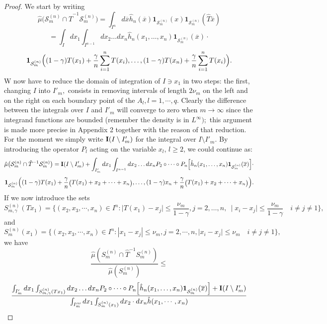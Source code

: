 \documentclass[12pt,reqno,a4paper]{amsart}
\begin{document}
\begin{proof}
We start  by writing
  $$\hat{\mu}\big(\mathcal{S}^{(n)}_{m}\cap\hat{T}^{-1}\mathcal{S}^{(n)}_{m}\big)= \int_{I^n} d\overline{x} \hat{h}_n(\overline{x}) \textbf{1}_{\mathcal{S}^{(n)}_{m}}(x)\textbf{1}_{\mathcal{S}^{(n)}_{m}}(\hat{T}\overline{x})$$
  $$ =\int_I dx_{1}\int_{I^{n-1}} dx_{2}\dots dx_{n} \hat{h}_n(x_1,\dots,x_n){\textbf{1}}_{\mathcal{S}^{(n)}_{m}}(\overline{x})\cdot $$$${\textbf{1}}_{\mathcal{S}^{(n)}_{m}}\Big({\tiny(1-\gamma)T(x_1)+ \frac{\gamma}{n}\sum_{i=1}^{n}T(x_{i}),\dots, (1-\gamma)T(x_n) +\frac{\gamma}{n}\sum_{i=1}^{n}T(x_{i})}\Big).$$
  W now have  to reduce the domain of integration of $I\ni x_1$ in two steps: the first, changing $I$ into $I'_m,$ consists in removing intervals of length $2\nu_m$ on the left and on the right on each boundary point of the $A_l, l=1,\cdots, q.$ Clearly the difference between the integrals over $I$ and $I'_m$ will converge to zero when $m\rightarrow \infty$ since the integrand functions are bounded (remember the density is in $L^{\infty});$  this argument is  made more precise in Appendix 2 together with the reason of that reduction. For the moment we simply write ${\bf I}(I \setminus I'_m)$ for the integral over $I\setminus I'_m.$
	 	By introducing the operator $P_l$ acting on the variable $x_l$, $l\ge 2$, we could continue  as:	 	$$\hat{\mu}\big(\mathcal{S}^{(n)}_{m}\cap\hat{T}^{-1}\mathcal{S}^{(n)}_{m}\big)= {\bf I}(I\setminus I'_m)+ \int_{I'_m} dx_{1}\int_{I^{n-1}} dx_{2}\dots dx_{n} P_{2}\circ\dots\circ P_{n} \Big[\hat{h}_n(x_1,\dots,x_n){\textbf{1}}_{\mathcal{S}^{(n)}_{m}}(\overline{x})\Big]\cdot	
	 	 $$
	 	$$ {\textbf{1}}_{\mathcal{S}^{(n)}_{m}}\Big({\tiny(1-\gamma)T(x_1) +\frac{\gamma}{n}\big(T(x_{1})+x_{2}+\dots+x_{n}\big),\dots, (1-\gamma)x_n +\frac{\gamma}{n}\big(T(x_{1})+x_{2}+\dots+x_{n}\big)}\Big).$$
If we now introduce the sets
$$
S^{(n)}_{m,\gamma}(Tx_1)=\{(x_2,x_3,\cdots,x_n)\in I^n: \mid T(x_1)-x_{j}\mid  \leq  \frac{\nu_{m}}{1-\gamma}, j= 2,\dots,n,\
	 	    \mid x_{i}-x_{j}\mid  \leq  \frac{\nu_{m}}{1-\gamma}\quad i\not=j\not=1\} ,
$$
and
$$
S^{(n)}_{m}(x_1)=\{(x_2,x_3,\cdots,x_n)\in I^n: |x_1-x_j|\le \nu_m, j=2,\cdots,n, \mid x_{i}-x_{j}\mid  \leq  \nu_{m}\quad i\not=j\not=1\},
$$
we have
$$
\frac{\hat{\mu}(S^{(n)}_m\cap \hat{T}^{-1} S^{(n)}_m)}{\hat{\mu}(S^{(n)}_m)}\le
$$
$$
\frac{\int_{I'_m} dx_1\int_{S^{(n)}_{m,\gamma}(Tx_1)} dx_{2}\dots dx_{n} P_{2}\circ\dots\circ P_{n} \Big[\hat{h}_n(x_1,\dots,x_n){\textbf{1}}_{\mathcal{S}^{(n)}_{m}}(\overline{x})\Big]+{\bf I}(I\setminus I'_m)}{\int_{I'''_m} dx_1\int_{S^{(n)}_{m}(x_1)}dx_2\cdot dx_n\hat{h}(x_1,\cdots,x_n)}
$$
\end{proof}
\end{document}
